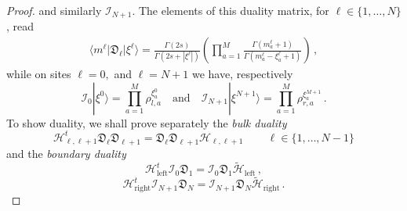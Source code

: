 \documentclass[11pt]{article}
\numberwithin{equation}{section}
\newcommand{\M}{M}
\newcommand{\N}{N}
\newcommand{\eH}{\mathcal{H}}
\begin{document}
\begin{proof}
	and similarly $\mathcal{I}_{\N+1}$.
The elements of this duality matrix, for $\ell\in\{1,\ldots, \N\}$, read 
	\begin{align}\label{element-duality-matrix}
		\langle m^{\ell}|\mathfrak{D}_{\ell}|\xi^{\ell}\rangle=
				\frac{\Gamma(2s)}{\Gamma(2s+|\xi^{\ell}|)}\left(\prod_{a=1}^{\M}\frac{\Gamma(m_{a}^{\ell}+1)}{\Gamma(m_{a}^{\ell}-\xi_{a}^{\ell}+1)}\right)\,,
	\end{align}
	while on sites $\ell=0,$ and $\ell=\N+1$ we have, respectively  
	\begin{equation}
		        \mathcal{I}_{0}|\xi^{0}\rangle=\prod_{a=1}^{\M}\rho_{l,a}^{\xi_{a}^{0}}\quad\text{and}\quad  \mathcal{I}_{\N+1}|\xi^{\N+1}\rangle =\prod_{a=1}^{\M}\rho_{r,a}^{\xi_{a}^{\M+1}}\,.
	\end{equation}
    To show duality, we shall prove separately the \textit{bulk duality}
		\begin{equation}\label{bulk-duality}
			\eH_{\ell,\ell+1}^{t}\mathfrak{D}_{\ell}\mathfrak{D}_{\ell+1}=\mathfrak{D}_{\ell}\mathfrak{D}_{\ell+1}\eH_{\ell,\ell+1}\, \qquad \ell\in \{1,\ldots,\N-1\} 
		\end{equation} 
		and the  \textit{boundary duality} 
		\begin{equation}\label{boundary-duality}
			\eH_{\text{left}}^{t}\mathcal{I}_{0}\mathfrak{D}_{1}=\mathcal{I}_{0}\mathfrak{D}_{1} \widetilde{\eH}_{\text{left}}\,,
		\end{equation} 
        		\begin{equation}\label{boundary-duality-right}
			\eH_{\text{right}}^{t}\mathcal{I}_{\N+1}\mathfrak{D}_{\N}=\mathcal{I}_{\N+1}\mathfrak{D}_{\N} \widetilde{\eH}_{\text{right}}\,.
		\end{equation}

\end{proof}
\end{document}
